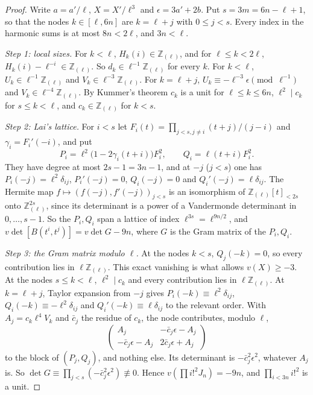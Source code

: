 \documentclass[11pt]{amsart}
\theoremstyle{definition}
\theoremstyle{remark}
\numberwithin{equation}{section}
\newcommand{\Z}{\mathbb Z}
\begin{document}
\begin{proof}
Write $a=a'/\ell$, $X=X'/\ell^3$ and $\epsilon=3a'+2b$. Put $s=3m=6n-\ell+1$, so that the nodes $k\in[\ell,6n]$ are
$k=\ell+j$ with $0\le j<s$. Every index in the harmonic sums is at most $8n<2\ell$, and $3n<\ell$.

\emph{Step 1: local sizes.} For $k<\ell$, $H_k(i)\in\Z_{(\ell)}$, and for $\ell\le k<2\ell$, $H_k(i)-\ell^{-i}\in\Z_{(\ell)}$. So
$d_k\in\ell^{-1}\Z_{(\ell)}$ for every $k$. For $k<\ell$, $U_k\in\ell^{-1}\Z_{(\ell)}$ and $V_k\in\ell^{-3}\Z_{(\ell)}$. For
$k=\ell+j$, $U_k\equiv-\ell^{-3}\epsilon\pmod{\ell^{-1}}$ and $V_k\in\ell^{-4}\Z_{(\ell)}$. By Kummer's theorem $c_k$ is a unit
for $\ell\le k\le6n$, $\ell^2\mid c_k$ for $s\le k<\ell$, and $c_k\in\Z_{(\ell)}$ for $k<s$.

\emph{Step 2: Lai's lattice.} For $i<s$ let $F_i(t)=\prod_{j<s,j\ne i}(t+j)/(j-i)$ and $\gamma_i=F_i'(-i)$, and put
\[
 P_i=\ell^2\bigl(1-2\gamma_i(t+i)\bigr)F_i^2,\qquad Q_i=\ell(t+i)F_i^2 .
\]
They have degree at most $2s-1=3n-1$, and at $-j$ ($j<s$) one has $P_i(-j)=\ell^2\delta_{ij}$, $P_i'(-j)=0$,
$Q_i(-j)=0$ and $Q_i'(-j)=\ell\delta_{ij}$. The Hermite map $f\mapsto(f(-j),f'(-j))_{j<s}$ is an isomorphism of
$\Z_{(\ell)}[t]_{<2s}$ onto $\Z_{(\ell)}^{2s}$, since its determinant is a power of a Vandermonde determinant in
$0,\dots,s-1$. So the $P_i,Q_i$ span a lattice of index $\ell^{3s}=\ell^{9n/2}$, and
$v\det[B(t^i,t^j)]=v\det G-9n$, where $G$ is the Gram matrix of the $P_i,Q_i$.

\emph{Step 3: the Gram matrix modulo $\ell$.} At the nodes $k<s$, $Q_j(-k)=0$, so every contribution lies in
$\ell\Z_{(\ell)}$. This exact vanishing is what allows $v(X)\ge-3$. At the nodes $s\le k<\ell$, $\ell^2\mid c_k$ and every
contribution lies in $\ell\Z_{(\ell)}$. At $k=\ell+j$, Taylor expansion from $-j$ gives $P_i(-k)\equiv\ell^2\delta_{ij}$,
$Q_i(-k)\equiv-\ell^2\delta_{ij}$ and $Q_i'(-k)\equiv\ell\delta_{ij}$ to the relevant order. With $A_j=c_k\ell^4V_k$ and
$\bar c_j$ the residue of $c_k$, the node contributes, modulo $\ell$,
\[
 \begin{pmatrix}A_j&-\bar c_j\epsilon-A_j\\-\bar c_j\epsilon-A_j&2\bar c_j\epsilon+A_j\end{pmatrix}
\]
to the block of $(P_j,Q_j)$, and nothing else. Its determinant is $-\bar c_j^2\epsilon^2$, whatever $A_j$ is. So
$\det G\equiv\prod_{j<s}(-\bar c_j^2\epsilon^2)\not\equiv0$. Hence $v(\prod i!^2J_n)=-9n$, and $\prod_{i<3n}i!^2$ is a unit.
\end{proof}
\end{document}
